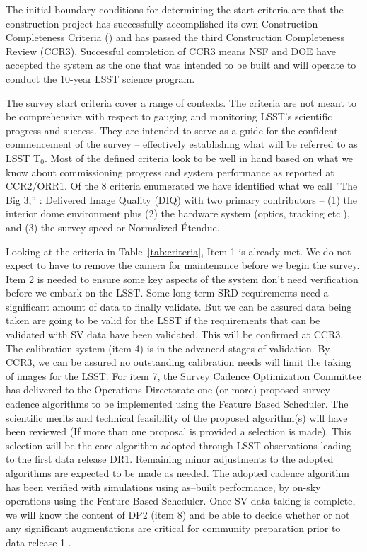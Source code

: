 The initial boundary conditions for determining the start criteria are that the construction project has successfully accomplished its own Construction Completeness Criteria (\cite{SITCOMTN-005}) and has passed the third Construction Completeness Review (CCR3).  Successful completion of CCR3 means NSF and DOE have accepted the system as the one that was intended to be built and will operate to conduct the 10-year LSST science program.  

The survey start criteria cover a range of contexts.  The criteria are not meant to be comprehensive with respect to gauging and monitoring LSST's scientific progress and success. They are intended to serve as a guide for the confident commencement of the survey -- effectively establishing what will be referred to as LSST T$_0$.  Most of the defined criteria look to be well in hand based on what we know about commissioning progress and system performance as reported at CCR2/ORR1.  Of the 8 criteria enumerated we have identified what we call ''The Big 3,'' : Delivered Image Quality (DIQ) with two primary contributors -- (1) the interior dome environment plus (2) the hardware system (optics, tracking etc.), and (3) the survey speed or Normalized \'{E}tendue. 

Looking at the criteria in Table~\ref{tab:criteria}, Item 1 is already met. We do not expect to have to remove the camera for maintenance before we begin the survey. Item 2 is needed to ensure some key aspects of the system don't need verification before we embark on the LSST. Some long term SRD requirements need a significant amount of data to finally validate. But we can be assured data being taken are going to be valid for the LSST if the requirements that can be validated with SV data have been validated. This will be confirmed at CCR3. The calibration system (item 4)  is in the advanced stages of validation. By CCR3, we can be assured no outstanding calibration needs will limit the taking of images for the LSST. For item 7, the Survey Cadence Optimization Committee has delivered to the Operations Directorate one (or more) proposed survey cadence algorithms to be implemented using the Feature Based Scheduler.  The scientific merits and technical feasibility of the proposed algorithm(s) will have been reviewed (If more than one proposal is provided a selection is made).  This selection will be the core algorithm adopted through LSST observations leading to the first data release DR1.  Remaining minor adjustments to the adopted algorithms are expected to be made as needed.  The adopted cadence algorithm has been verified with simulations using as--built performance, by on-sky operations using the Feature Based Scheduler.  Once SV data taking is complete, we will know the content of DP2 (item 8) and be able to decide whether or not any significant augmentations are critical for community preparation prior to data release 1 \citep[DR1; see][]{RTN-011}. 

